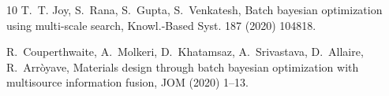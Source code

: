 \documentclass[preprint,12pt,times]{elsarticle}  %
\providecommand{\JournalTitle}[1]{#1}
\begin{document}
\begin{thebibliography}{10}
T.~T. Joy, S.~Rana, S.~Gupta, S.~Venkatesh, Batch bayesian optimization using
  multi-scale search, {\JournalTitle{Knowl.-Based Syst.}} 187 (2020) 104818.

R.~Couperthwaite, A.~Molkeri, D.~Khatamsaz, A.~Srivastava, D.~Allaire,
  R.~Arr{\`o}yave, Materials design through batch bayesian optimization with
  multisource information fusion, {\JournalTitle{JOM}} (2020) 1--13.

\end{thebibliography}

\end{document}
